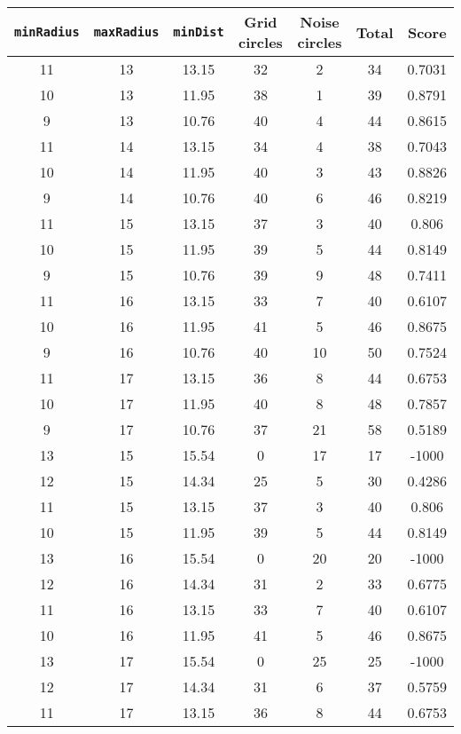 \documentclass[letterpaper, 12pt]{article}
\begin{document}
\begin{longtable}{|c|c|c|c|c|c|c|}
\hline
\textbf{\texttt{minRadius}} & \textbf{\texttt{maxRadius}} & \textbf{\texttt{minDist}} & \textbf{Grid circles} & \textbf{Noise circles} & \textbf{Total} & \textbf{Score} \\
\hline
11 & 13 & 13.15 & 32 & 2 & 34 & 0.7031 \\
\hline
10 & 13 & 11.95 & 38 & 1 & 39 & 0.8791 \\
\hline
9 & 13 & 10.76 & 40 & 4 & 44 & 0.8615 \\
\hline
11 & 14 & 13.15 & 34 & 4 & 38 & 0.7043 \\
\hline
10 & 14 & 11.95 & 40 & 3 & 43 & 0.8826 \\
\hline
9 & 14 & 10.76 & 40 & 6 & 46 & 0.8219 \\
\hline
11 & 15 & 13.15 & 37 & 3 & 40 & 0.806 \\
\hline
10 & 15 & 11.95 & 39 & 5 & 44 & 0.8149 \\
\hline
9 & 15 & 10.76 & 39 & 9 & 48 & 0.7411 \\
\hline
11 & 16 & 13.15 & 33 & 7 & 40 & 0.6107 \\
\hline
10 & 16 & 11.95 & 41 & 5 & 46 & 0.8675 \\
\hline
9 & 16 & 10.76 & 40 & 10 & 50 & 0.7524 \\
\hline
11 & 17 & 13.15 & 36 & 8 & 44 & 0.6753 \\
\hline
10 & 17 & 11.95 & 40 & 8 & 48 & 0.7857 \\
\hline
9 & 17 & 10.76 & 37 & 21 & 58 & 0.5189 \\
\hline
13 & 15 & 15.54 & 0 & 17 & 17 & -1000 \\
\hline
12 & 15 & 14.34 & 25 & 5 & 30 & 0.4286 \\
\hline
11 & 15 & 13.15 & 37 & 3 & 40 & 0.806 \\
\hline
10 & 15 & 11.95 & 39 & 5 & 44 & 0.8149 \\
\hline
13 & 16 & 15.54 & 0 & 20 & 20 & -1000 \\
\hline
12 & 16 & 14.34 & 31 & 2 & 33 & 0.6775 \\
\hline
11 & 16 & 13.15 & 33 & 7 & 40 & 0.6107 \\
\hline
10 & 16 & 11.95 & 41 & 5 & 46 & 0.8675 \\
\hline
13 & 17 & 15.54 & 0 & 25 & 25 & -1000 \\
\hline
12 & 17 & 14.34 & 31 & 6 & 37 & 0.5759 \\
\hline
11 & 17 & 13.15 & 36 & 8 & 44 & 0.6753 \\

\end{longtable}
\end{document}
